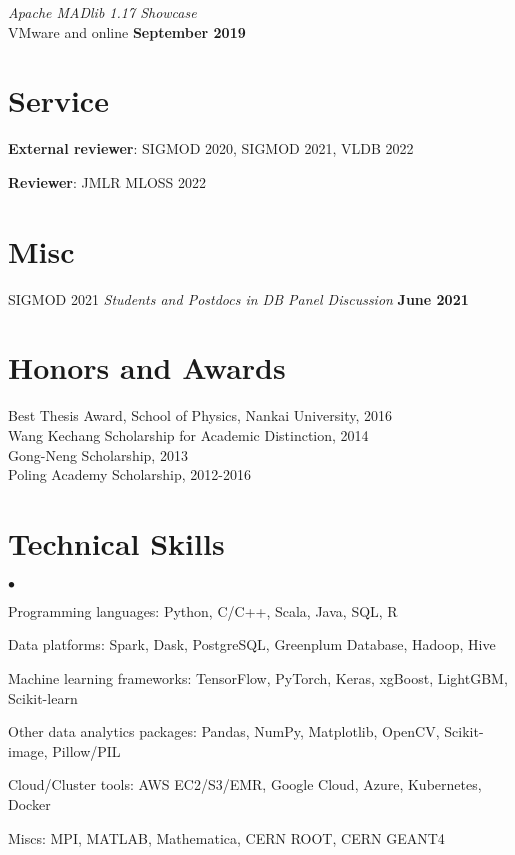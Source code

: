 \documentclass[margin,line]{res}
\newenvironment{list2}{
 \begin{list}{$\bullet$}{%
   \setlength{\itemsep}{0in}
   \setlength{\parsep}{0in} \setlength{\parskip}{0in}
   \setlength{\topsep}{0in} \setlength{\partopsep}{0in} 
   \setlength{\leftmargin}{0.2in}}}{\end{list}}
\begin{document}
\begin{resume}
\vspace{-3mm}
\textit{Apache MADlib 1.17 Showcase}\\
VMware and online \hfill {\bf September 2019}\\


\section{\sc Service}

\textbf{External reviewer}: SIGMOD 2020, SIGMOD 2021, VLDB 2022

\textbf{Reviewer}: JMLR MLOSS 2022


\section{\sc Misc}

SIGMOD 2021 \textit{Students and Postdocs in DB Panel Discussion} \hfill {\bf June 2021}


\section{\sc Honors and Awards} 
Best Thesis Award, School of Physics, Nankai University, 2016\\
Wang Kechang Scholarship for Academic Distinction, 2014\\
Gong-Neng Scholarship, 2013\\
Poling Academy Scholarship, 2012-2016


\section{\sc Technical Skills} 
\begin{list2}
\item Programming languages: Python, C/C++, Scala, Java, SQL, R
\item Data platforms: Spark, Dask, PostgreSQL, Greenplum Database, Hadoop, Hive
\item Machine learning frameworks: TensorFlow, PyTorch, Keras, xgBoost, LightGBM, Scikit-learn
\item Other data analytics packages: Pandas, NumPy, Matplotlib, OpenCV, Scikit-image, Pillow/PIL
\item Cloud/Cluster tools: AWS EC2/S3/EMR, Google Cloud, Azure, Kubernetes, Docker
\item Miscs: MPI, MATLAB, Mathematica, CERN ROOT, CERN GEANT4\\ 
\end{list2}



\end{resume}
\end{document}
